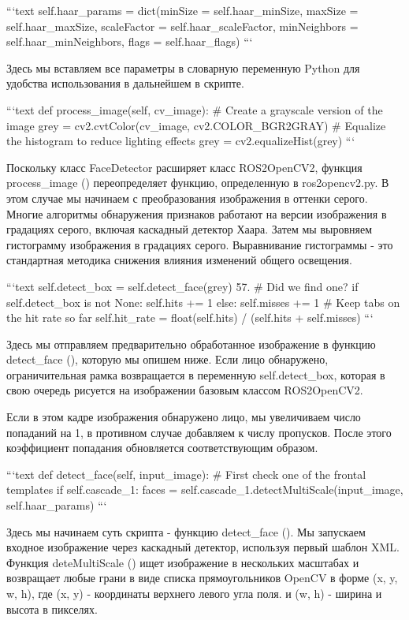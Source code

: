 ```text
self.haar_params = dict(minSize = self.haar_minSize, maxSize = self.haar_maxSize,
scaleFactor = self.haar_scaleFactor, minNeighbors = self.haar_minNeighbors, flags = self.haar_flags)
```

Здесь мы вставляем все параметры в словарную переменную Python для удобства использования в дальнейшем в скрипте.

```text
def process_image(self, cv_image):
# Create a grayscale version of the image
grey = cv2.cvtColor(cv_image, cv2.COLOR_BGR2GRAY)
# Equalize the histogram to reduce lighting effects
grey = cv2.equalizeHist(grey)
```

Поскольку класс FaceDetector расширяет класс ROS2OpenCV2, функция process\_image () переопределяет функцию, определенную в ros2opencv2.py. В этом случае мы начинаем с преобразования изображения в оттенки серого. Многие алгоритмы обнаружения признаков работают на версии изображения в градациях серого, включая каскадный детектор Хаара. Затем мы выровняем гистограмму изображения в градациях серого. Выравнивание гистограммы - это стандартная методика снижения влияния изменений общего освещения.

```text
self.detect_box = self.detect_face(grey) 57.
# Did we find one?
if self.detect_box is not None:
self.hits += 1
else:
self.misses += 1
# Keep tabs on the hit rate so far
self.hit_rate = float(self.hits) / (self.hits + self.misses)
```

Здесь мы отправляем предварительно обработанное изображение в функцию detect\_face (), которую мы опишем ниже. Если лицо обнаружено, ограничительная рамка возвращается в переменную self.detect\_box, которая в свою очередь рисуется на изображении базовым классом ROS2OpenCV2.

Если в этом кадре изображения обнаружено лицо, мы увеличиваем число попаданий на 1, в противном случае добавляем к числу пропусков. После этого коэффициент попадания обновляется соответствующим образом.

```text
def detect_face(self, input_image):
# First check one of the frontal templates if self.cascade_1:
faces = self.cascade_1.detectMultiScale(input_image, \textbf{}self.haar_params)
```

Здесь мы начинаем суть скрипта - функцию detect\_face (). Мы запускаем входное изображение через каскадный детектор, используя первый шаблон XML. Функция deteMultiScale () ищет изображение в нескольких масштабах и возвращает любые грани в виде списка прямоугольников OpenCV в форме (x, y, w, h), где (x, y) - координаты верхнего левого угла поля. и (w, h) - ширина и высота в пикселях.

